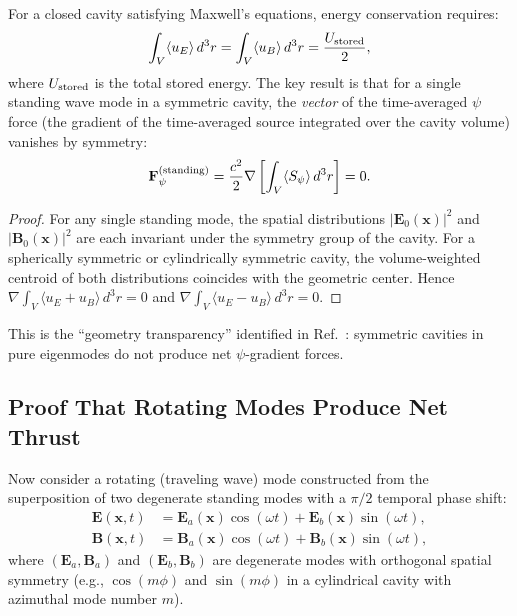 \documentclass[twocolumn,prl,superscriptaddress,nofootinbib,longbibliography,floatfix]{revtex4-2}
\begin{document}
For a closed cavity satisfying Maxwell's equations, energy conservation
requires:
\begin{equation}
\int_V \langle u_E \rangle\,d^3r
= \int_V \langle u_B \rangle\,d^3r
= \frac{U_{\rm stored}}{2},
\label{eq:equipartition}
\end{equation}
where $U_{\rm stored}$ is the total stored energy.  The key result is
that for a single standing wave mode in a symmetric cavity, the
\emph{vector} of the time-averaged $\psi$ force (the gradient of the
time-averaged source integrated over the cavity volume) vanishes by
symmetry:
\begin{equation}
\mathbf{F}_\psi^{\rm (standing)} =
\frac{c^2}{2}\nabla\left[\int_V \langle S_\psi \rangle\,d^3r\right]
= 0.
\label{eq:standing-cancel}
\end{equation}

\begin{proof}
For any single standing mode, the spatial distributions
$|\mathbf{E}_0(\mathbf{x})|^2$ and $|\mathbf{B}_0(\mathbf{x})|^2$ are
each invariant under the symmetry group of the cavity.  For a
spherically symmetric or cylindrically symmetric cavity, the
volume-weighted centroid of both distributions coincides with the
geometric center.  Hence $\nabla\int_V \langle u_E + u_B\rangle\,d^3r
= 0$ and $\nabla\int_V \langle u_E - u_B\rangle\,d^3r = 0$.
\end{proof}

This is the ``geometry transparency'' identified in
Ref.~\cite{Alcock2025EMcoupling}: symmetric cavities in pure eigenmodes
do not produce net $\psi$-gradient forces.

\subsection{Proof That Rotating Modes Produce Net Thrust}

Now consider a rotating (traveling wave) mode constructed from the
superposition of two degenerate standing modes with a
$\pi/2$ temporal phase shift:
\begin{align}
\mathbf{E}(\mathbf{x},t) &=
\mathbf{E}_a(\mathbf{x})\cos(\omega t)
+ \mathbf{E}_b(\mathbf{x})\sin(\omega t),
\label{eq:rotating-E}\\
\mathbf{B}(\mathbf{x},t) &=
\mathbf{B}_a(\mathbf{x})\cos(\omega t)
+ \mathbf{B}_b(\mathbf{x})\sin(\omega t),
\label{eq:rotating-B}
\end{align}
where $(\mathbf{E}_a, \mathbf{B}_a)$ and
$(\mathbf{E}_b, \mathbf{B}_b)$ are degenerate modes with orthogonal
spatial symmetry (e.g., $\cos(m\phi)$ and $\sin(m\phi)$ in a
cylindrical cavity with azimuthal mode number $m$).
\end{document}
